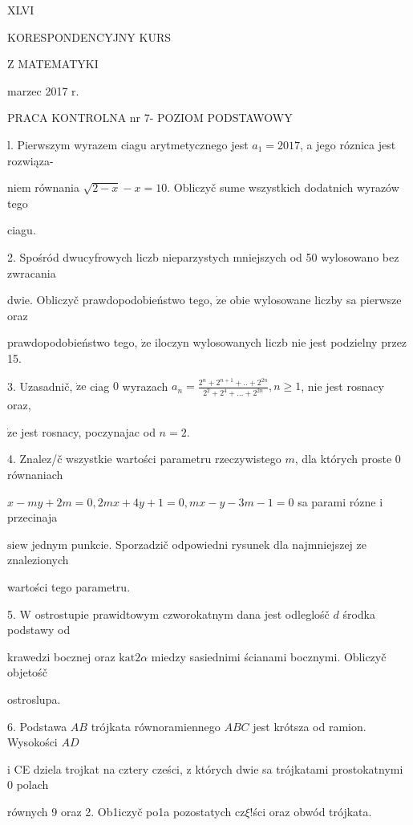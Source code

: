 \documentclass[a4paper,12pt]{article}
\begin{document}
XLVI

KORESPONDENCYJNY KURS

Z MATEMATYKI

marzec 2017 r.

PRACA KONTROLNA nr 7- POZIOM PODSTAWOWY

l. Pierwszym wyrazem ciagu arytmetycznego jest $a_{1}=2017$, a jego róznica jest rozwiąza-

niem równania $\sqrt{2-x}-x = 10$. Obliczyč sume wszystkich dodatnich wyrazów tego

ciagu.

2. Spośród dwucyfrowych liczb nieparzystych mniejszych od 50 wylosowano bez zwracania

dwie. Obliczyč prawdopodobieństwo tego, $\dot{\mathrm{z}}\mathrm{e}$ obie wylosowane liczby sa pierwsze oraz

prawdopodobieństwo tego, $\dot{\mathrm{z}}\mathrm{e}$ iloczyn wylosowanych liczb nie jest podzielny przez 15.

3. Uzasadnič, $\dot{\mathrm{z}}\mathrm{e}$ ciag $0$ wyrazach $a_{n}=\displaystyle \frac{2^{n}+2^{n+1}+..+2^{2n}}{2^{2}+2^{4}+\ldots+2^{2n}}, n\geq 1$, nie jest rosnacy oraz,

$\dot{\mathrm{z}}\mathrm{e}$ jest rosnacy, poczynajac od $n=2.$

4. Znalez/č wszystkie wartości parametru rzeczywistego $m$, dla których proste $0$ równaniach

$x-my+2m=0, 2mx+4y+1=0, mx-y-3m-1=0$ sa parami rózne $\mathrm{i}$ przecinaja

$\mathrm{s}\mathrm{i}\mathrm{e}\mathrm{w}$ jednym punkcie. Sporzadzič odpowiedni rysunek dla najmniejszej ze znalezionych

wartości tego parametru.

5. $\mathrm{W}$ ostrostupie prawidtowym czworokatnym dana jest odleglośč $d$ środka podstawy od

krawedzi bocznej oraz $\mathrm{k}\mathrm{a}\mathrm{t}2\alpha$ miedzy sasiednimi ścianami bocznymi. Obliczyč objetośč

ostroslupa.

6. Podstawa $AB$ trójkata równoramiennego $ABC$ jest krótsza od ramion. Wysokości $AD$

$\mathrm{i}$ CE dziela trojkat na cztery cześci, $\mathrm{z}$ których dwie sa trójkatami prostokatnymi $0$ polach

równych 9 oraz 2. Ob1iczyč po1a pozostatych cz$\xi$!ści oraz obwód trójkata.
\end{document}

